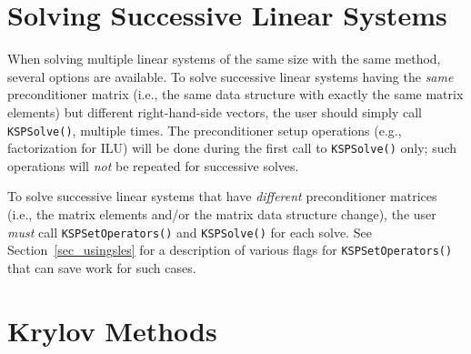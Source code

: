 \section{Solving Successive Linear Systems}

When solving multiple linear systems of the same size with the same
method, several options are available.  To solve successive linear
systems having the {\em same} preconditioner matrix (i.e., the same
data structure with exactly the same matrix elements) but different
right-hand-side vectors, the user should simply call \lstinline{KSPSolve()},
multiple times.  The preconditioner setup operations (e.g.,
factorization for ILU) will be done during the first call to \lstinline{KSPSolve()} only; such operations will {\em not} be repeated for
successive solves.

To solve successive linear systems that have {\em different}
preconditioner matrices (i.e., the matrix elements and/or the matrix
data structure change), the user {\em must} call
\lstinline{KSPSetOperators()} and \lstinline{KSPSolve()} for each solve.  See
Section~\ref{sec_usingsles} for a description of various flags for
\lstinline{KSPSetOperators()} that can save work for such cases.

\section{Krylov Methods}
\label{sec_ksp}

